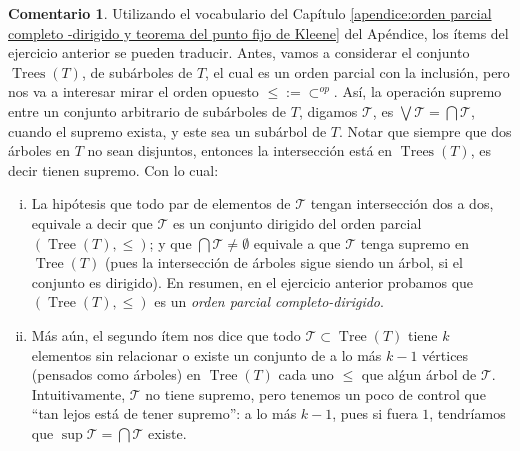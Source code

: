 \documentclass[12pt]{report}
\theoremstyle{plain}
\theoremstyle{definition}
\newtheorem{remark}[theorem]{Comentario}
\begin{document}
\begin{remark}
Utilizando el vocabulario del Capítulo \ref{apendice:orden parcial completo
-dirigido y teorema del punto fijo de Kleene} del Apéndice, los ítems del ejercicio anterior se pueden traducir.
Antes, vamos a considerar el conjunto $\operatorname{Trees} (T)$, de subárboles de $T$, el cual es un orden parcial
con la inclusión, pero nos va a interesar mirar el orden opuesto $\leq:= \subset^{op}$. Así, la operación supremo
entre un conjunto arbitrario de subárboles de $T$, digamos $\mathcal T$, es $\bigvee \mathcal T = \bigcap \mathcal T$, cuando el supremo exista, y este sea un subárbol de $T$. Notar que siempre que dos árboles en $T$ no sean disjuntos, entonces la intersección está en $\operatorname{Trees} (T)$, es decir tienen supremo. Con lo cual:
\begin{enumerate}[(i)]
\item La hipótesis que todo par de elementos de $\mathcal T$ tengan intersección dos a dos, equivale a decir que $\mathcal T$ es
un
conjunto dirigido del orden parcial $(\operatorname{Tree} (T), \leq )$; y que $\bigcap \mathcal T \neq \emptyset$
equivale a que $\mathcal T$ tenga supremo en $\operatorname{Tree} (T)$ (pues la intersección de árboles sigue siendo
un árbol, si el conjunto es dirigido). En resumen, en el ejercicio anterior probamos que $(\operatorname{Tree} (T), \leq)$ es un \textit{orden parcial completo-dirigido}.
\item Más aún, el segundo ítem nos dice que todo $\mathcal T \subset \operatorname{Tree}(T)$ tiene $k$ elementos sin
relacionar o existe un conjunto de a lo más $k-1$ vértices (pensados como árboles) en $\operatorname{Tree} (T)$ cada
uno $\leq$ que alǵun árbol de $\mathcal T$. Intuitivamente, $\mathcal T$ no tiene supremo, pero tenemos un poco de
control que ``tan lejos está de tener supremo'': a lo más $k-1$, pues si fuera $1$, tendríamos que $\sup \mathcal T = \bigcap \mathcal T $ existe.
\end{enumerate}
\end{remark}
\end{document}
